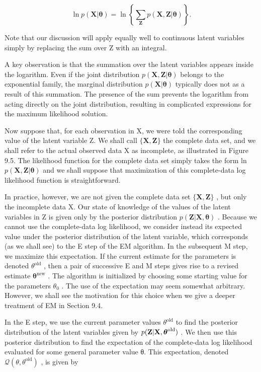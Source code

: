 \documentclass[
  10
]{article}
\begin{document}
\[
\ln p (\mathbf {X} | \boldsymbol {\theta}) = \ln \left\{\sum_ {\mathbf {Z}} p (\mathbf {X}, \mathbf {Z} | \boldsymbol {\theta}) \right\}.\tag{9.29}
\]

Note that our discussion will apply equally well to continuous latent
variables simply by replacing the sum over Z with an integral.

A key observation is that the summation over the latent variables
appears inside the logarithm. Even if the joint distribution
\(p ( \mathbf { X } , \mathbf { Z } | \boldsymbol { \theta } )\) belongs
to the exponential family, the marginal distribution
\(p ( \mathbf { X } | \pmb { \theta } )\) typically does not as a result
of this summation. The presence of the sum prevents the logarithm from
acting directly on the joint distribution, resulting in complicated
expressions for the maximum likelihood solution.

Now suppose that, for each observation in X, we were told the
corresponding value of the latent variable Z. We shall call
\(\{ \mathbf { X } , \mathbf { Z } \}\) the complete data set, and we
shall refer to the actual observed data X as incomplete, as illustrated
in Figure 9.5. The likelihood function for the complete data set simply
takes the form ln
\(p ( \mathbf { X } , \mathbf { Z } | \boldsymbol { \theta } )\) and we
shall suppose that maximization of this complete-data log likelihood
function is straightforward.

In practice, however, we are not given the complete data set
\(\{ \mathbf { X } , \mathbf { Z } \}\) , but only the incomplete data
X. Our state of knowledge of the values of the latent variables in Z is
given only by the posterior distribution
\(p ( \mathbf { Z } | \mathbf { X } , \pmb \theta )\) . Because we
cannot use the complete-data log likelihood, we consider instead its
expected value under the posterior distribution of the latent variable,
which corresponds (as we shall see) to the E step of the EM algorithm.
In the subsequent M step, we maximize this expectation. If the current
estimate for the parameters is denoted
\(\theta ^ { \mathrm { o l d } }\) , then a pair of successive E and M
steps gives rise to a revised estimate
\(\pmb { \theta } ^ { \mathrm { n e w } }\) . The algorithm is
initialized by choosing some starting value for the parameters
\(\theta _ { 0 }\) . The use of the expectation may seem somewhat
arbitrary. However, we shall see the motivation for this choice when we
give a deeper treatment of EM in Section 9.4.

In the E step, we use the current parameter values
\(\theta ^ { \mathrm { o l d } }\) to find the posterior distribution of
the latent variables given by
\(p ( { \bf Z } | { \bf X } , \boldsymbol { \theta } ^ { \mathrm { o l d } } )\)
. We then use this posterior distribution to find the expectation of the
complete-data log likelihood evaluated for some general parameter value
θ. This expectation, denoted
\(\mathcal { Q } ( \theta , \theta ^ { \mathrm { o l d } } )\) , is
given by
\end{document}
